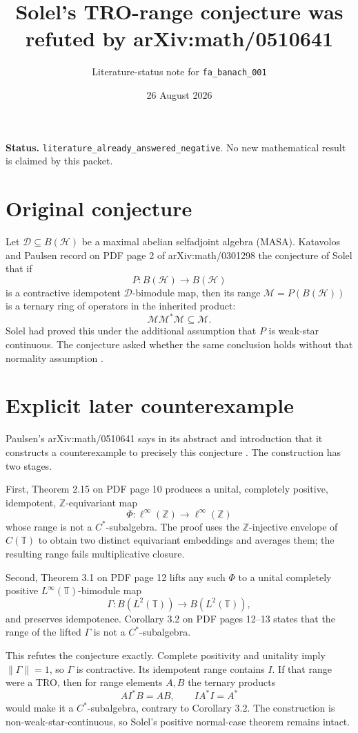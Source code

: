 \documentclass[11pt]{article}
\title{Solel's TRO-range conjecture was refuted by arXiv:math/0510641}
\author{Literature-status note for \texttt{fa\_banach\_001}}
\date{26 August 2026}
\begin{document}
\maketitle

\noindent\textbf{Status.}
\texttt{literature\_already\_answered\_negative}.  No new mathematical
result is claimed by this packet.

\section*{Original conjecture}

Let $\mathcal D\subseteq B(\mathcal H)$ be a maximal abelian selfadjoint
algebra (MASA).  Katavolos and Paulsen record on PDF page 2 of
arXiv:math/0301298 the conjecture of Solel that if
\[
 P:B(\mathcal H)\longrightarrow B(\mathcal H)
\]
is a contractive idempotent $\mathcal D$-bimodule map, then its range
$\mathcal M=P(B(\mathcal H))$ is a ternary ring of operators in the inherited
product:
\[
 \mathcal M\mathcal M^*\mathcal M\subseteq\mathcal M.
\]
Solel had proved this under the additional assumption that $P$ is
weak-star continuous.  The conjecture asked whether the same conclusion
holds without that normality assumption \cite{KP2003}.

\section*{Explicit later counterexample}

Paulsen's arXiv:math/0510641 says in its abstract and introduction that it
constructs a counterexample to precisely this conjecture \cite{P2005}.
The construction has two stages.

First, Theorem 2.15 on PDF page 10 produces a unital, completely positive,
idempotent, $\mathbb Z$-equivariant map
\[
 \Phi:\ell^\infty(\mathbb Z)\longrightarrow\ell^\infty(\mathbb Z)
\]
whose range is not a $C^*$-subalgebra.  The proof uses the
$\mathbb Z$-injective envelope of $C(\mathbb T)$ to obtain two distinct
equivariant embeddings and averages them; the resulting range fails
multiplicative closure.

Second, Theorem 3.1 on PDF page 12 lifts any such $\Phi$ to a unital
completely positive $L^\infty(\mathbb T)$-bimodule map
\[
 \Gamma:B(L^2(\mathbb T))\longrightarrow B(L^2(\mathbb T)),
\]
and preserves idempotence.  Corollary 3.2 on PDF pages 12--13 states that the
range of the lifted $\Gamma$ is not a $C^*$-subalgebra.

This refutes the conjecture exactly.  Complete positivity and unitality imply
$\|\Gamma\|=1$, so $\Gamma$ is contractive.  Its idempotent range contains
$I$.  If that range were a TRO, then for range elements $A,B$ the ternary
products
\[
 A I^* B=AB,\qquad I A^* I=A^*
\]
would make it a $C^*$-subalgebra, contrary to Corollary 3.2.  The construction
is non-weak-star-continuous, so Solel's positive normal-case theorem remains
intact.
\end{document}
